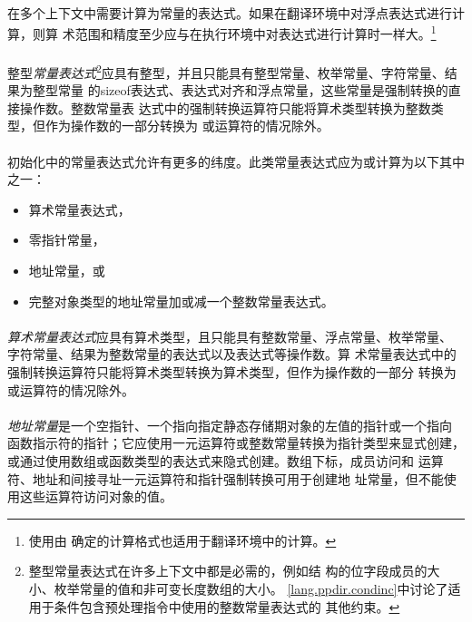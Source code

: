 \semantic
\paragraph{}
在多个上下文中需要计算为常量的表达式。如果在翻译环境中对浮点表达式进行计算，则算
术范围和精度至少应与在执行环境中对表达式进行计算时一样大。\footnote{使用由
确定的计算格式也适用于翻译环境中的计算。}

\paragraph{}
整型\textit{常量表达式}\footnote{整型常量表达式在许多上下文中都是必需的，例如结
构的位字段成员的大小、枚举常量的值和非可变长度数组的大小。
\ref{lang.ppdir.condinc}中讨论了适用于条件包含预处理指令中使用的整数常量表达式的
其他约束。}应具有整型，并且只能具有整型常量、枚举常量、字符常量、结果为整型常量
的sizeof表达式、表达式对齐和浮点常量，这些常量是强制转换的直接操作数。整数常量表
达式中的强制转换运算符只能将算术类型转换为整数类型，但作为操作数的一部分转换为
或运算符的情况除外。

\paragraph{}
初始化中的常量表达式允许有更多的纬度。此类常量表达式应为或计算为以下其中之一：
\begin{itemize}
  \item{算术常量表达式，}
  \item{零指针常量，}
  \item{地址常量，或}
  \item{完整对象类型的地址常量加或减一个整数常量表达式。}
\end{itemize}

\paragraph{}
\textit{算术常量表达式}应具有算术类型，且只能具有整数常量、浮点常量、枚举常量、
字符常量、结果为整数常量的表达式以及表达式等操作数。算
术常量表达式中的强制转换运算符只能将算术类型转换为算术类型，但作为操作数的一部分
转换为或运算符的情况除外。

\paragraph{}
\textit{地址常量}是一个空指针、一个指向指定静态存储期对象的左值的指针或一个指向
函数指示符的指针；它应使用一元运算符\tm{\&}或整数常量转换为指针类型来显式创建，
或通过使用数组或函数类型的表达式来隐式创建。数组下标\tm{[]}，成员访问和
\tm{-\tg}运算符、地址\tm{\&}和间接寻址\tm{*}一元运算符和指针强制转换可用于创建地
址常量，但不能使用这些运算符访问对象的值。

